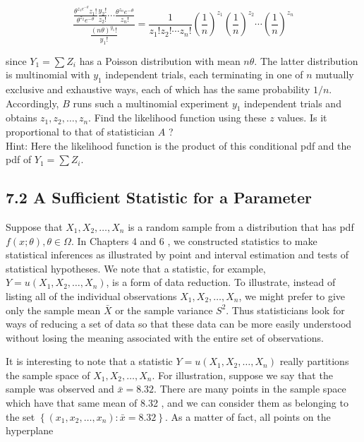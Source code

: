 $$
\frac{\frac{\theta^{z_{1} e^{-\theta}} z_{1}!}{\theta^{z_{2}} e^{-\theta}} \frac{y_{2}!}{z_{2}!} \cdots \frac{\theta^{z_{n}} e^{-\theta}}{z_{n}!}}{\frac{(n \theta)^{y_{1}}!}{y_{1}!}}=\frac{1}{z_{1}!z_{2}!\cdots z_{n}!}\left(\frac{1}{n}\right)^{z_{1}}\left(\frac{1}{n}\right)^{z_{2}} \cdots\left(\frac{1}{n}\right)^{z_{n}}
$$

since $Y_{1}=\sum Z_{i}$ has a Poisson distribution with mean $n \theta$. The latter distribution is multinomial with $y_{1}$ independent trials, each terminating in one of $n$ mutually exclusive and exhaustive ways, each of which has the same probability $1 / n$. Accordingly, $B$ runs such a multinomial experiment $y_{1}$ independent trials and obtains $z_{1}, z_{2}, \ldots, z_{n}$. Find the likelihood function using these $z$ values. Is it proportional to that of statistician $A$ ?\\
Hint: Here the likelihood function is the product of this conditional pdf and the pdf of $Y_{1}=\sum Z_{i}$.

\subsection*{7.2 A Sufficient Statistic for a Parameter}
Suppose that $X_{1}, X_{2}, \ldots, X_{n}$ is a random sample from a distribution that has pdf $f(x ; \theta), \theta \in \Omega$. In Chapters 4 and 6 , we constructed statistics to make statistical inferences as illustrated by point and interval estimation and tests of statistical hypotheses. We note that a statistic, for example, $Y=u\left(X_{1}, X_{2}, \ldots, X_{n}\right)$, is a form of data reduction. To illustrate, instead of listing all of the individual observations $X_{1}, X_{2}, \ldots, X_{n}$, we might prefer to give only the sample mean $\bar{X}$ or the sample variance $S^{2}$. Thus statisticians look for ways of reducing a set of data so that these data can be more easily understood without losing the meaning associated with the entire set of observations.

It is interesting to note that a statistic $Y=u\left(X_{1}, X_{2}, \ldots, X_{n}\right)$ really partitions the sample space of $X_{1}, X_{2}, \ldots, X_{n}$. For illustration, suppose we say that the sample was observed and $\bar{x}=8.32$. There are many points in the sample space which have that same mean of 8.32 , and we can consider them as belonging to the set $\left\{\left(x_{1}, x_{2}, \ldots, x_{n}\right): \bar{x}=8.32\right\}$. As a matter of fact, all points on the hyperplane

